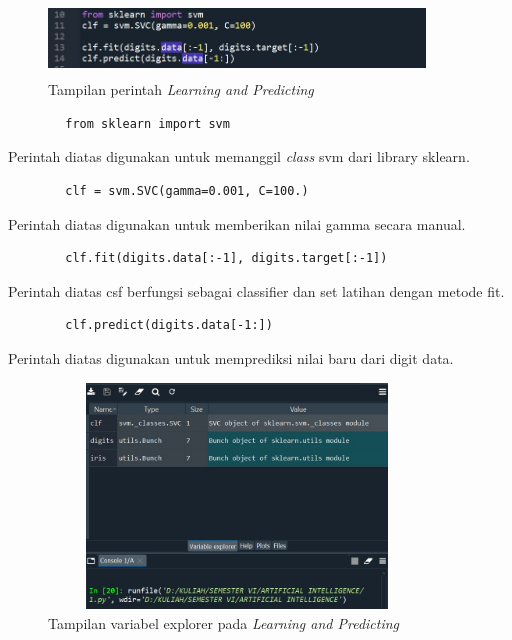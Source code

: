 \documentclass{article}
\begin{document}
\begin{figure}[!htbp]
            \centering
            \includegraphics[width=10cm,height=2cm]{figures/1184101/chapter1/9.jpeg}
            \caption{Tampilan perintah \textit{Learning and Predicting}}
            \label{penanda}
            \end{figure}
    
    
        \begin{verbatim}
        from sklearn import svm \end{verbatim}
        Perintah diatas digunakan untuk memanggil \textit{class} svm dari library sklearn.
        \begin{verbatim}
        clf = svm.SVC(gamma=0.001, C=100.) \end{verbatim}
        Perintah diatas digunakan untuk memberikan nilai gamma secara manual.
        \begin{verbatim}
        clf.fit(digits.data[:-1], digits.target[:-1])
       \end{verbatim}
        Perintah diatas csf berfungsi sebagai classifier dan set latihan dengan metode fit.
        \begin{verbatim}
        clf.predict(digits.data[-1:])
        \end{verbatim}
        Perintah diatas digunakan untuk memprediksi nilai baru dari digit data.
    
    \begin{figure}[!htbp]
            \centering
            \includegraphics[width=10cm,height=6cm]{figures/1184101/chapter1/10.jpeg}
            \caption{Tampilan variabel explorer pada \textit{Learning and Predicting}}
            \label{penanda}
            \end{figure}
\end{document}

